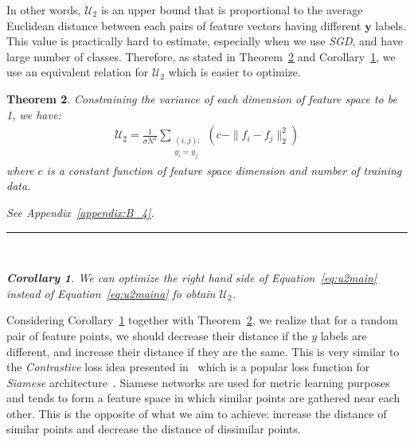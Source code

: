 \documentclass[10pt,journal,compsoc]{IEEEtran}
\newcommand{\BlackBox}{\rule{1.5ex}{1.5ex}}  %
\newenvironment{proof}{\par\noindent{\bf Proof\ }}{\hfill\BlackBox\\[2mm]}
\newtheorem{theorem}{Theorem}
\newtheorem{corollary}[theorem]{Corollary}
\begin{document}
In other words, $\mathcal{U}_2$ is an upper bound that is proportional to the average Euclidean distance between each pairs of feature vectors having different $\textbf{y}$ labels. This value is practically hard to estimate, especially when we use \emph{SGD}, and have large number of classes. Therefore, as stated in Theorem~\ref{th3} and Corollary~\ref{corol}, we use an equivalent relation for $\mathcal{U}_2$ which is easier to optimize.

\begin{theorem} \label{th3}
	Constraining the variance of each dimension of feature space to be 1, we have:
	\begin{align}\label{eq:u2main}
	\mathcal{U}_2 = \frac{1}{\sigma N^2}\sum_{\substack{(i,j):\\y_i = y_j}} (c - \|f_i-f_j\|_2^2) 
	\end{align}
	where $c$ is a constant function of feature space dimension and number of training data. 
	\begin{proof}
		See Appendix~\ref{appendix:B_4}.
	\end{proof}
	\begin{corollary} \label{corol}
		We can optimize the right hand side of Equation~\ref{eq:u2main} instead of Equation~\ref{eq:u2maina} fo obtain $\mathcal{U}_2$. %
	\end{corollary}
\end{theorem}Considering Corollary~\ref{corol} together with Theorem~\ref{th3}, we realize that for a random pair of feature points, we should decrease their distance if the $y$ labels are different, and increase their distance if they are the same. This is very similar to the \emph{Contrastive} loss idea presented in~\cite{hadsell2006} which is a popular loss function for \emph{Siamese} architecture~\cite{chopra2005}. Siamese networks are used for metric learning purposes and tends to form a feature space in which similar points are gathered near each other. This is the opposite of what we aim to achieve: increase the distance of similar points and decrease the distance of dissimilar points. 
\end{document}
